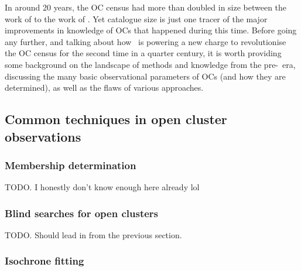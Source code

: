 In around 20 years, the OC census had more than doubled in size between the work of \cite{mermilliod_database_1995} to the work of \cite{kharchenko_global_2013}. Yet catalogue size is just one tracer of the major improvements in knowledge of OCs that happened during this time. Before going any further, and talking about how \gaia\ is powering a new charge to revolutionise the OC census for the second time in a quarter century, it is worth providing some background on the landscape of methods and knowledge from the pre-\gaia\ era, discussing the many basic observational parameters of OCs (and how they are determined), as well as the flaws of various approaches.

\subsection{Common techniques in open cluster observations}
\label{sec:intro:history:techniques}
\subsubsection{Membership determination}

TODO. I honestly don't know enough here already lol

\subsubsection{Blind searches for open clusters}

TODO. Should lead in from the previous section.

\subsubsection{Isochrone fitting}

